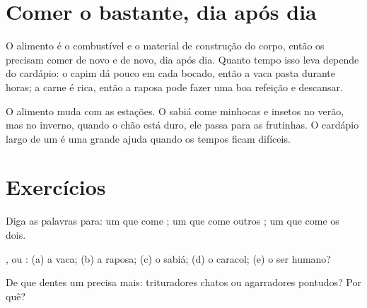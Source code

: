 \section{Comer o bastante, dia após dia}

\begin{proposition}\label{prop:g2:what-animals-eat:daily}
O alimento é o combustível e o material de construção do corpo, então
os  precisam comer de novo e de novo, dia após dia. Quanto
tempo isso leva depende do cardápio: o capim dá pouco em cada
bocado, então a vaca pasta durante horas; a carne é rica, então a
raposa pode fazer uma boa refeição e descansar.
\end{proposition}
\admitted

\begin{example}\label{ex:g2:what-animals-eat:winter}
O alimento muda com as estações. O sabiá come minhocas e insetos no
verão, mas no inverno, quando o chão está duro, ele passa para as
frutinhas. O cardápio largo de um  é uma grande ajuda quando
os tempos ficam difíceis.
\end{example}

\section{Exercícios}

\begin{exercise}[$\star$]\label{exo:g2:what-animals-eat:1}
Diga as palavras para: um  que come ; um  que
come outros ; um  que come os dois.
\end{exercise}

\begin{exercise}[$\star$]\label{exo:g2:what-animals-eat:2}
,  ou : (a) a vaca; (b) a raposa; (c) o
sabiá; (d) o caracol; (e) o ser humano?
\end{exercise}

\begin{exercise}[$\star$]\label{exo:g2:what-animals-eat:3}
De que dentes um  precisa mais: trituradores chatos ou
agarradores pontudos? Por quê?
\end{exercise}

